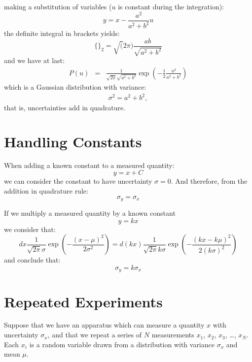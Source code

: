 \documentclass[12pt,oneside]{book}
\begin{document}
making a substitution of variables ($u$ is constant during the integration):
\begin{equation*}
y = x-\frac{a^2}{a^2+b^2}u
\end{equation*}
the definite integral in brackets yields:
\begin{equation}
\{\}_2 = \sqrt(2 \pi) \frac{a b}{\sqrt{a^2+b^2}}
\end{equation}
and we have at last:
\begin{eqnarray*}
P(u) &=& \frac{1}{\sqrt{2\pi} \sqrt{a^2+b^2}}  \exp \left( -\frac{1}{2} \frac{u^2}{a^2+b^2} \right)
\end{eqnarray*}
which is a Gaussian distribution with variance:
\begin{eqnarray*}
\sigma^2 = a^2 + b^2,
\end{eqnarray*}
that is, uncertainties add in quadrature.

\section{Handling Constants}

When adding a known constant to a measured quantity:
\begin{equation*}
y = x + C
\end{equation*}
we can consider the constant to have uncertainty $\sigma=0$.  And therefore, from the addition in quadrature rule:
\begin{equation*}
\sigma_y = \sigma_x
\end{equation*}

If we multiply a measured quantity by a known constant 
\begin{equation*}
y = k x 
\end{equation*}
we consider that:
\begin{displaymath}
dx \frac{1}{\sqrt{2\pi} \sigma} \exp\left(-\frac{(x-\mu)^2}{2\sigma^2}\right) = d(kx) \frac{1}{\sqrt{2\pi} k\sigma} \exp\left(-\frac{(kx-k\mu)^2}{2(k\sigma)^2}\right)
\end{displaymath}
and conclude that:
\begin{equation*}
\sigma_y = k \sigma_x
\end{equation*}

\section{Repeated Experiments}

Suppose that we have an apparatus which can measure a quantity $x$
with uncertainty $\sigma_x$, and that we repeat a series of $N$
measurements $x_1$, $x_2$, $x_3$, \ldots, $x_N$. Each $x_i$ is a
random variable drawn from a distribution with variance $\sigma_x$ and
mean $\mu$.
\end{document}

